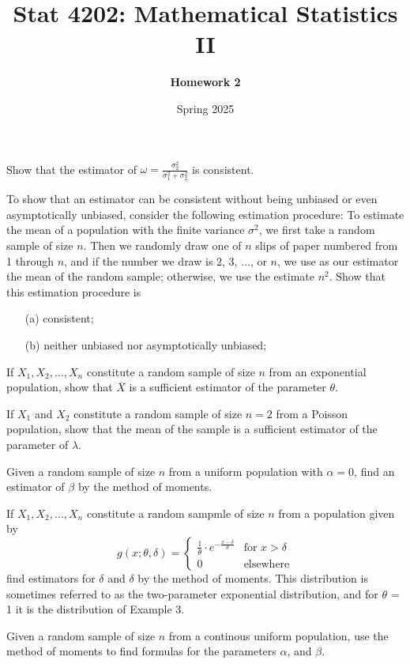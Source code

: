 \documentclass[11pt]{article}
\title{Stat 4202: Mathematical Statistics II}
\author{\textbf{Homework 2}}
\date{Spring 2025}
\begin{document}
\maketitle
\begin{question}
    Show that the estimator of \(\omega = \frac{\sigma_2^2}{\sigma_1^2 + \sigma_2^2}\) is consistent.
\end{question}

\begin{question}
    To show that an estimator can be consistent without being unbiased or even asymptotically unbiased, consider the following estimation procedure: To estimate the mean of a population with the finite variance $\sigma^2$, we first take a random sample of size $n$. Then we randomly draw one of $n$ slips of paper numbered from 1 through $n$, and if the number we draw is 2, 3, \(\ldots\), or $n$, we use as our estimator the mean of the random sample; otherwise, we use the estimate $n^2$. Show that this estimation procedure is
    \begin{itemize}
        \item [(a)] consistent;
        \item [(b)] neither unbiased nor asymptotically unbiased;
    \end{itemize}
\end{question}
\begin{question}
    If $X_1, X_2, \ldots, X_n$ constitute a random sample of size $n$ from an exponential population, show that $\overline{X}$ is a sufficient estimator of the parameter $\theta$.
\end{question}
\begin{question}
    If \(X_1\) and \(X_2\) constitute a random sample of size \(n = 2\) from a Poisson population, show that the mean of the sample is a sufficient estimator of the parameter of \(\lambda\).
\end{question}
\begin{question}
    Given a random sample of size \(n\) from a uniform population with \(\alpha = 0\), find an estimator of \(\beta\) by the method of moments.
\end{question}
\begin{question}
    If \(X_1, X_2, \ldots, X_n\) constitute a random sampmle of size \(n\) from a population given by 
    \[
g(x; \theta, \delta) = \begin{cases}
\frac{1}{\theta} \cdot e^{-\frac{x - \delta}{\theta}} & \text{for } x > \delta \\
0 & \text{elsewhere}
\end{cases}
\]
find estimators for \(\delta\) and \(\delta\) by the method of moments. This distribution is sometimes referred to as the two-parameter exponential distribution, and for \(\theta\) = 1 it is the distribution of Example 3.
\end{question}

\begin{question}
    Given a random sample of size \(n\) from a continous uniform population, use the method of moments to find formulas for the parameters \(\alpha\), and \(\beta\).
\end{question}
\end{document}
